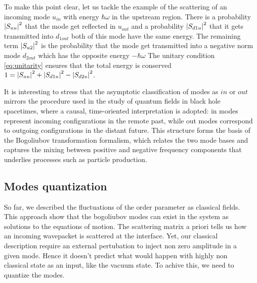 To make this point clear, let us tackle the example of the scattering of an incoming mode $u_{in}$ with energy $\hbar\omega$ in the upstream region. 
There is a probability $\abs{S_{uu}}^2$ that the mode get reflected in $u_{out}$ and a probability $\abs{S_{d1u}}^2$ that it gets transmitted into $d_{1out}$ both of this mode have the same energy. The remaining term $\abs{S_{u2}}^2$ is the probability that the mode get transmitted into a negative norm mode $d_{2out}$ which has the opposite energy $-\hbar\omega$
The unitary condition \autoref{eq:unitarity} ensures that the total energy is conserved $1=\abs{S_{uu}}^2+\abs{S_{d1u}}^2-\abs{S_{d2u}}^2$.


It is interesting to stress that the asymptotic classification of modes as $in$ or $out$ mirrors the procedure used in the study of quantum fields in black hole spacetimes, where a causal, time-oriented interpretation is adopted: in modes represent incoming configurations in the remote past, while out modes correspond to outgoing configurations in the distant future.
 This structure forms the basis of the Bogoliubov transformation formalism, which relates the two mode bases and captures the mixing between positive and negative frequency components that underlies processes such as particle production.
\subsection{Modes quantization}
\label{subsec:quantization}
So far, we described the fluctuations of the order parameter as classical fields. This approach
show that the bogoliubov modes can exist in the system as solutions to the equations of motion. The scattering matrix
a priori tells us how an incoming wavepacket is scattered at the interface.
Yet, our classical description require an external pertubation to inject non zero amplitude in a given mode. Hence it doesn't
predict what would happen with highly non classical state as an input, like the vacuum state. To achive this, we need to quantize the modes.

